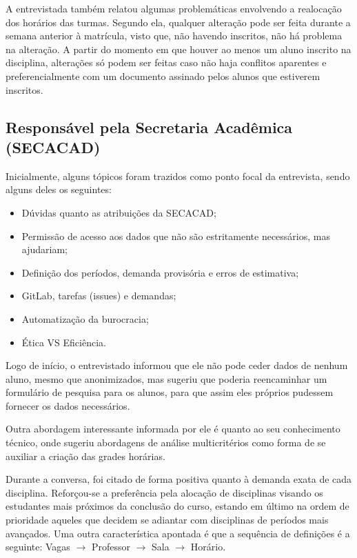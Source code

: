 A entrevistada também relatou algumas problemáticas envolvendo a realocação dos horários das turmas. Segundo ela, qualquer alteração pode ser feita durante a semana anterior à matrícula, visto que, não havendo inscritos, não há problema na alteração. A partir do momento em que houver ao menos um aluno inscrito na disciplina, alterações só podem ser feitas caso não haja conflitos aparentes e preferencialmente com um documento assinado pelos alunos que estiverem inscritos.

\subsection{Responsável pela Secretaria Acadêmica (SECACAD)} \label{subsec:3_Responsável} %

Inicialmente, alguns tópicos foram trazidos como ponto focal da entrevista, sendo alguns deles os seguintes:

\begin{itemize}
  \item Dúvidas quanto as atribuições da SECACAD;
  \item Permissão de acesso aos dados que não são estritamente necessários, mas ajudariam;
  \item Definição dos períodos, demanda provisória e erros de estimativa;
  \item GitLab, tarefas (issues) e demandas;
  \item Automatização da burocracia;
  \item Ética VS Eficiência.
\end{itemize}

Logo de início, o entrevistado informou que ele não pode ceder dados de nenhum aluno, mesmo que anonimizados, mas sugeriu que poderia reencaminhar um formulário de pesquisa para os alunos, para que assim eles próprios pudessem fornecer os dados necessários.

Outra abordagem interessante informada por ele é quanto ao seu conhecimento técnico, onde sugeriu abordagens de análise multicritérios como forma de se auxiliar a criação das grades horárias.

Durante a conversa, foi citado de forma positiva quanto à demanda exata de cada disciplina. Reforçou-se a preferência pela alocação de disciplinas visando os estudantes mais próximos da conclusão do curso, estando em último na ordem de prioridade aqueles que decidem se adiantar com disciplinas de períodos mais avançados. Uma outra característica apontada é que a sequência de definições é a seguinte: Vagas $\rightarrow$ Professor $\rightarrow$ Sala $\rightarrow$ Horário.

